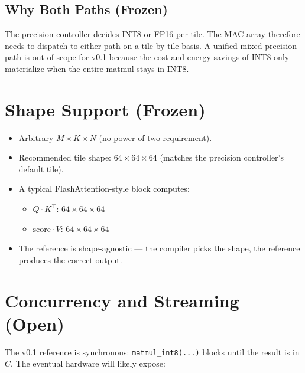 \documentclass[11pt]{article}
\begin{document}
\subsection{Why Both Paths (Frozen)}
\label{sec:bothpaths}

The precision controller decides INT8 or FP16 per tile. The MAC array
therefore needs to dispatch to either path on a tile-by-tile basis. A
unified mixed-precision path is out of scope for v0.1 because the
cost and energy savings of INT8 only materialize when the entire
matmul stays in INT8.

\section{Shape Support (Frozen)}
\label{sec:shapes}

\begin{itemize}
\item Arbitrary $M \times K \times N$ (no power-of-two requirement).
\item Recommended tile shape: $64 \times 64 \times 64$ (matches the
      precision controller's default tile).
\item A typical FlashAttention-style block computes:
      \begin{itemize}
      \item $Q \cdot K^{\top}$: $64 \times 64 \times 64$
      \item $\text{score} \cdot V$: $64 \times 64 \times 64$
      \end{itemize}
\item The reference is shape-agnostic --- the compiler picks the
      shape, the reference produces the correct output.
\end{itemize}

\section{Concurrency and Streaming (Open)}
\label{sec:concurrency}

The v0.1 reference is synchronous: \texttt{matmul\_int8(...)} blocks
until the result is in $C$. The eventual hardware will likely expose:
\end{document}
